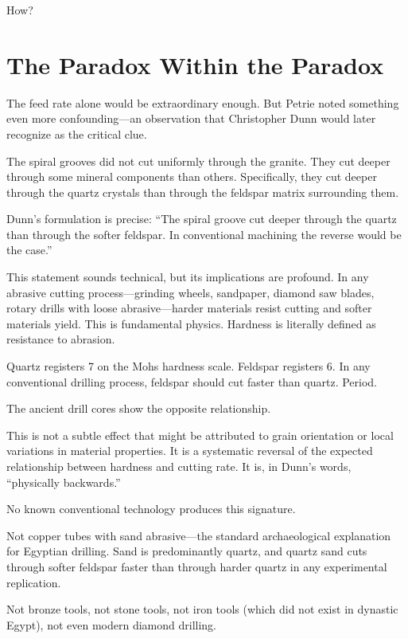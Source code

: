 \documentclass[11pt]{article}
\begin{document}
How?

\section{The Paradox Within the Paradox}

The feed rate alone would be extraordinary enough. But Petrie noted something even more confounding---an observation that Christopher Dunn would later recognize as the critical clue.

The spiral grooves did not cut uniformly through the granite. They cut deeper through some mineral components than others. Specifically, they cut deeper through the quartz crystals than through the feldspar matrix surrounding them.

Dunn's formulation is precise: ``The spiral groove cut deeper through the quartz than through the softer feldspar. In conventional machining the reverse would be the case.''

This statement sounds technical, but its implications are profound. In any abrasive cutting process---grinding wheels, sandpaper, diamond saw blades, rotary drills with loose abrasive---harder materials resist cutting and softer materials yield. This is fundamental physics. Hardness is literally defined as resistance to abrasion.

Quartz registers 7 on the Mohs hardness scale. Feldspar registers 6. In any conventional drilling process, feldspar should cut faster than quartz. Period.

The ancient drill cores show the opposite relationship.

This is not a subtle effect that might be attributed to grain orientation or local variations in material properties. It is a systematic reversal of the expected relationship between hardness and cutting rate. It is, in Dunn's words, ``physically backwards.''

No known conventional technology produces this signature.

Not copper tubes with sand abrasive---the standard archaeological explanation for Egyptian drilling. Sand is predominantly quartz, and quartz sand cuts through softer feldspar faster than through harder quartz in any experimental replication.

Not bronze tools, not stone tools, not iron tools (which did not exist in dynastic Egypt), not even modern diamond drilling.
\end{document}
